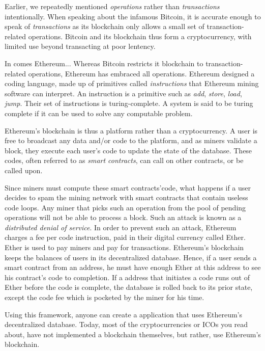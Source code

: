 Earlier, we repeatedly mentioned \emph{operations} rather than \emph{transactions} intentionally.
When speaking about the infamous Bitcoin, it is accurate enough to speak of \emph{transactions} as its blockchain
only allows a small set of transaction-related operations.
Bitcoin and its blockchain thus form a cryptocurrency, with limited use beyond transacting at poor lentency.

In comes Ethereum...
Whereas Bitcoin restricts it blockchain to transaction-related operations, Ethereum has embraced all operations.
Ethereum designed a coding language, made up of primitives called \emph{instructions} that Ethereum mining software can interpret.
An instruction is a primitive such as \emph{add}, \emph{store}, \emph{load}, \emph{jump}. 
Their set of instructions is turing-complete.
A system is said to be turing complete if it can be used to solve any computable problem.

Ethereum's blockchain is thus a platform rather than a cryptocurrency.
A user is free to broadcast any data and/or code to the platform, and as miners validate a block,
they execute each user's code to update the state of the database.
These codes, often referred to as \emph{smart contracts}, can call on other contracts, or be called upon.

Since miners must compute these smart contracts'code, what happens if a user decides to spam the mining network with
smart contracts that contain useless code loops. 
Any miner that picks such an operation from the pool of pending operations will not be able to process a block.
Such an attack is known as a \emph{distributed denial of service}.
In order to prevent such an attack, Ethereum charges a fee per code instruction, paid in their digital currency called Ether.
Ether is used to pay miners and pay for transactions.
Ethereum's blockchain keeps the balances of users in its decentralized database.
Hence, if a user sends a smart contract from an address, he must have enough Ether at this address to see his contract's code
to completion.
If a address that initiates a code runs out of Ether before the code is complete, the database is rolled back to its prior
state, except the code fee which is pocketed by the miner for his time.

Using this framework, anyone can create a application that uses Ethereum's decentralized database.
Today, most of the cryptocurrencies or ICOs you read about, have not implemented a blockchain themselves,
but rather, use Ethereum's blockchain.

